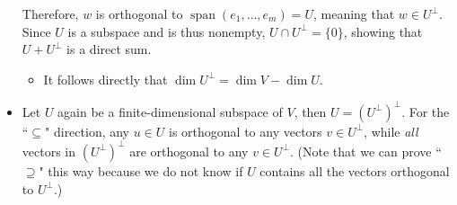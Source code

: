 \documentclass{article}
\newcommand{\s}{\operatorname{span}}
\renewcommand{\d}{\dim}
\begin{document}
\begin{itemize}
    Therefore, $w$ is orthogonal to $\s(e_1,\dots,e_m) = U$, meaning that $w \in U^\perp$. Since $U$ is a subspace and is thus nonempty, $U \cap U^\perp = \{0\}$, showing that $U + U^\perp$ is a direct sum.
    \begin{itemize}
        \item It follows directly that $\d U^\perp = \d V - \d U$.
    \end{itemize}
    \item Let $U$ again be a finite-dimensional subspace of $V$, then $U=(U^\perp)^\perp$. For the ``$\subseteq$" direction, any $u \in U$ is orthogonal to any vectors $v \in U^\perp$, while \textit{all} vectors in $(U^\perp)^\perp$ are orthogonal to any $v \in U^\perp$. (Note that we can prove ``$\supseteq$" this way because we do not know if $U$ contains all the vectors orthogonal to $U^\perp$.)
    

\end{itemize}
\end{document}
